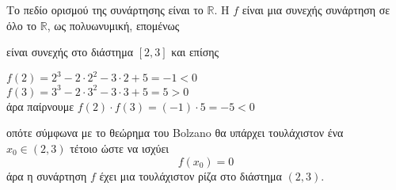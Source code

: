 Το πεδίο ορισμού της συνάρτησης είναι το $ \mathbb{R} $. Η $ f $ είναι μια συνεχής συνάρτηση σε όλο το $ \mathbb{R} $, ως πολυωνυμική, επομένως
\begin{rlist}
\item είναι συνεχής στο διάστημα $ [2,3] $ και επίσης
\item $ f(2)=2^3-2\cdot 2^2-3\cdot2+5=-1<0 $ \\
$ f(3)=3^3-2\cdot3^2-3\cdot3+5=5>0  $\\
άρα παίρνουμε $ f(2)\cdot f(3)=(-1)\cdot 5=-5<0 $
\end{rlist}
οπότε σύμφωνα με το θεώρημα του Bolzano θα υπάρχει τουλάχιστον ένα $ x_0\in(2,3) $ τέτοιο ώστε να ισχύει
\[ f(x_0)=0 \]
άρα η συνάρτηση $ f $ έχει μια τουλάχιστον ρίζα στο διάστημα $ (2,3) $.
